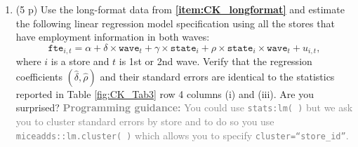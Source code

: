 \documentclass[
]{article}
\newenvironment{Shaded}{\begin{snugshade}}{\end{snugshade}}
\newcommand{\CommentTok}[1]{\textcolor[rgb]{0.56,0.35,0.01}{\textit{#1}}}
\newcommand{\DecValTok}[1]{\textcolor[rgb]{0.00,0.00,0.81}{#1}}
\newcommand{\FunctionTok}[1]{\textcolor[rgb]{0.13,0.29,0.53}{\textbf{#1}}}
\newcommand{\NormalTok}[1]{#1}
\newcommand{\OtherTok}[1]{\textcolor[rgb]{0.56,0.35,0.01}{#1}}
\newcommand{\SpecialCharTok}[1]{\textcolor[rgb]{0.81,0.36,0.00}{\textbf{#1}}}
\newcommand{\StringTok}[1]{\textcolor[rgb]{0.31,0.60,0.02}{#1}}
\providecommand{\tightlist}{%
  \setlength{\itemsep}{0pt}\setlength{\parskip}{0pt}}
\begin{document}
\begin{enumerate}
\def\labelenumi{\arabic{enumi}.}
\setcounter{enumi}{15}
\tightlist
\item
  (5 p) Use the long-format data from \textbf{\ref{item:CK_longformat}}
  and estimate the following linear regression model specification using
  all the stores that have employment information in both waves:
  \begin{equation}\label{eq:CK_DD}
  \texttt{fte}_{i,t}=\alpha + \delta \times \texttt{wave}_t + \gamma \times \texttt{state}_i + \rho \times \texttt{state}_i\times\texttt{wave}_{t}+u_{i,t},
  \end{equation} \noindent where \(i\) is a store and \(t\) is 1st or
  2nd wave. Verify that the regression coefficients
  \((\hat{\delta}, \hat{\rho})\) and their standard errors are identical
  to the statistics reported in Table \ref{fig:CK_Tab3} row 4 columns
  (i) and (iii). Are you surprised?
  \textcolor{gray}{\textbf{Programming guidance:} You could use \texttt{stats:lm( )} but we ask you to cluster standard errors by store and to do so you use \texttt{miceadds::lm.cluster( )} which allows you to specify \texttt{cluster=``store\_id''}.}
\end{enumerate}

\begin{Shaded}
\end{Shaded}
\end{document}
